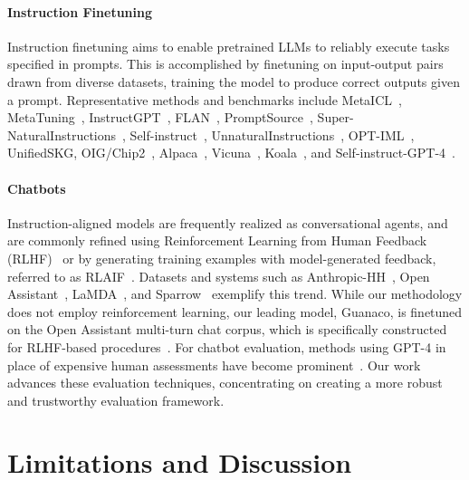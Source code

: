 \paragraph{Instruction Finetuning} Instruction finetuning aims to enable pretrained LLMs to reliably execute tasks specified in prompts. This is accomplished by finetuning on input-output pairs drawn from diverse datasets, training the model to produce correct outputs given a prompt. Representative methods and benchmarks include MetaICL~\citep{min2021metaicl}, MetaTuning~\citep{zhong2021adapting}, InstructGPT~\citep{ouyang2022training}, FLAN~\citep{wei2021finetuned,chung2022scaling}, PromptSource~\citep{bach2022promptsource}, Super-NaturalInstructions~\citep{wang2022super,sanh2021multitask}, Self-instruct~\citep{wang2022self}, UnnaturalInstructions~\citep{honovich2022unnatural}, OPT-IML~\citep{iyer2022opt}, UnifiedSKG\citep{xie2022unifiedskg}, OIG/Chip2~\citep{laion2023}, Alpaca~\citep{alpaca}, Vicuna~\citep{vicuna2023}, Koala~\citep{koala_blogpost_2023}, and Self-instruct-GPT-4~\citep{peng2023instruction}.

\paragraph{Chatbots} Instruction-aligned models are frequently realized as conversational agents, and are commonly refined using Reinforcement Learning from Human Feedback (RLHF)~\citep{christiano2017deep} or by generating training examples with model-generated feedback, referred to as RLAIF~\citep{bai2022constitutional}. Datasets and systems such as Anthropic-HH~\citep{askell2021general,bai2022training}, Open Assistant~\citep{kopf2023openassistant}, LaMDA~\citep{thoppilan2022lamda}, and Sparrow~\citep{glaese2022improving} exemplify this trend. While our methodology does not employ reinforcement learning, our leading model, Guanaco, is finetuned on the Open Assistant multi-turn chat corpus, which is specifically constructed for RLHF-based procedures~\citep{kopf2023openassistant}. For chatbot evaluation, methods using GPT-4 in place of expensive human assessments have become prominent~\citep{vicuna2023,peng2023instruction}. Our work advances these evaluation techniques, concentrating on creating a more robust and trustworthy evaluation framework.

\section{Limitations and Discussion}

